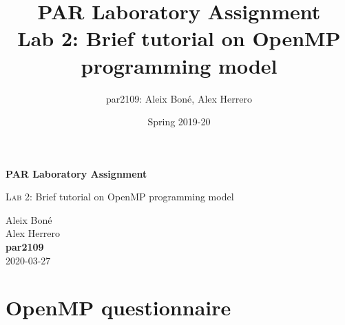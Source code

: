

\usepackage{caption}
\usepackage{subcaption}
\usepackage{graphicx}
\usepackage{enumitem}
\usepackage{lipsum}

\usepackage{siunitx}
\usepackage{hyphenat}

\usepackage{xcolor}

\usepackage{minted}

\renewcommand\theadfont{\bfseries}

\title{
    PAR Laboratory Assignment\\
    Lab 2: Brief tutorial on OpenMP programming model
}

\author{
    par2109:
    Aleix Boné,
    Alex Herrero
}

\date{
    Spring 2019-20
}



\thispagestyle{empty}
\clearpage
\setcounter{page}{-1}

\begin{titlepage}
{
    \centering
    \null
    \vfill
    {\Huge \bfseries PAR Laboratory Assignment\par}
    \vspace{3em}
    {\Large {\scshape Lab 2:} Brief tutorial on OpenMP programming model\par}
    \vfill
\begin{center}
\end{center}
    \vspace{3cm}

    \vfill
    {\raggedleft \Large
        Aleix Boné\\
        Alex Herrero\\
        {\bfseries\ttfamily par2109}\\
        \vspace{4em}
        2020-03-27
        \par}
}
\end{titlepage}

\section{OpenMP questionnaire}%
\label{sec:OpenMP questionnaire}


